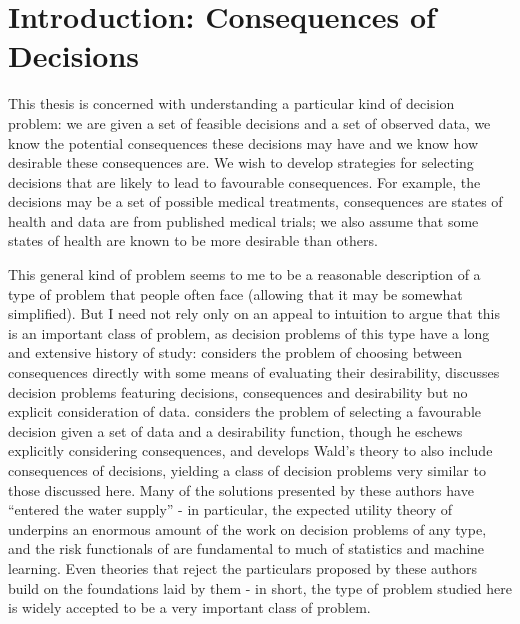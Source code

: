 
\section{Introduction: Consequences of Decisions}

This thesis is concerned with understanding a particular kind of decision problem: we are given a set of feasible decisions and a set of observed data, we know the potential consequences these decisions may have and we know how desirable these consequences are. We wish to develop strategies for selecting decisions that are likely to lead to favourable consequences. For example, the decisions may be a set of possible medical treatments, consequences are states of health and data are from published medical trials; we also assume that some states of health are known to be more desirable than others. 

This general kind of problem seems to me to be a reasonable description of a type of problem that people often face (allowing that it may be somewhat simplified). But I need not rely only on an appeal to intuition to argue that this is an important class of problem, as decision problems of this type have a long and extensive history of study: \citet{von_neumann_theory_1944} considers the problem of choosing between consequences directly with some means of evaluating their desirability, \citet{weirich_causal_2016} discusses decision problems featuring decisions, consequences and desirability but no explicit consideration of data. \citet{wald_statistical_1950} considers the problem of selecting a favourable decision given a set of data and a desirability function, though he eschews explicitly considering consequences, and \citet{savage_foundations_1972} develops Wald's theory to also include consequences of decisions, yielding a class of decision problems very similar to those discussed here. Many of the solutions presented by these authors have ``entered the water supply'' - in particular, the expected utility theory of \citet{von_neumann_theory_1944} underpins an enormous amount of the work on decision problems of any type, and the risk functionals of \citet{wald_statistical_1950} are fundamental to much of statistics and machine learning. Even theories that reject the particulars proposed by these authors build on the foundations laid by them - in short, the type of problem studied here is widely accepted to be a very important class of problem.

